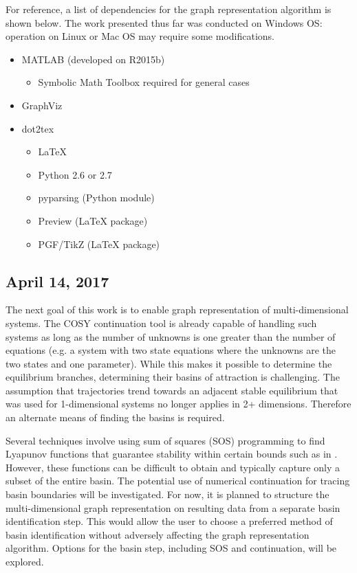 \documentclass[12pt]{article}
\begin{document}
For reference, a list of dependencies for the graph representation algorithm is shown below. The work presented thus far was conducted on Windows OS: operation on Linux or Mac OS may require some modifications.

\begin{itemize}
\item MATLAB (developed on R2015b)
	\begin{itemize}
	\item Symbolic Math Toolbox required for general cases
	\end{itemize}
\item GraphViz
\item dot2tex
	\begin{itemize}
	\item LaTeX
	\item Python 2.6 or 2.7
	\item pyparsing (Python module)
	\item Preview (LaTeX package)
	\item PGF/TikZ (LaTeX package)
	\end{itemize}
\end{itemize}


\subsection{April 14, 2017}
The next goal of this work is to enable graph representation of multi-dimensional systems. The COSY continuation tool is already capable of handling such systems as long as the number of unknowns is one greater than the number of equations (e.g. a system with two state equations where the unknowns are the two states and one parameter). While this makes it possible to determine the equilibrium branches, determining their basins of attraction is challenging. The assumption that trajectories trend towards an adjacent stable equilibrium that was used for 1-dimensional systems no longer applies in 2+ dimensions. Therefore an alternate means of finding the basins is required.

Several techniques involve using sum of squares (SOS) programming to find Lyapunov functions that guarantee stability within certain bounds such as in \cite{tan}. However, these functions can be difficult to obtain and typically capture only a subset of the entire basin. The potential use of numerical continuation for tracing basin boundaries will be investigated. For now, it is planned to structure the multi-dimensional graph representation on resulting data from a separate basin identification step. This would allow the user to choose a preferred method of basin identification without adversely affecting the graph representation algorithm. Options for the basin step, including SOS and continuation, will be explored.
\end{document}
